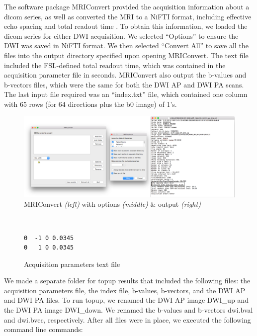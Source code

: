 The software package MRIConvert provided the acquisition information about a dicom series, as well as converted the MRI to a NiFTI format, including effective echo spacing and total readout time \cite{ref:mriconvert}. To obtain this information, we loaded the dicom series for either DWI acquisition. We selected ``Options'' to ensure the DWI was saved in NiFTI format. We then selected ``Convert All'' to save all the files into the output directory specified upon opening MRIConvert. The text file included the FSL-defined total readout time, which was contained in the acquisition parameter file in seconds. MRIConvert also output the b-values and b-vectors files, which were the same for both the DWI AP and DWI PA scans. The last input file required was an ``index.txt'' file, which contained one column with 65 rows (for 64 directions plus the b0 image) of 1's.

\begin{figure}[H]
    \centering
    \includegraphics[width=\textwidth]{Figures/combined}
    \caption{MRIConvert \textit{(left)} with options \textit{(middle)} \& output \textit{(right)} }
    \label{fig:mri_convert}
\end{figure}

\begin{figure}[H]
\centering
{\tt
\begin{varwidth}{\linewidth}
\begin{verbatim}
0  -1 0 0.0345
0   1 0 0.0345
\end{verbatim}
\end{varwidth}
}
\label{fig:acq}
\caption{Acquisition parameters text file}
\end{figure}

We made a separate folder for topup results that included the following files: the acquisition parameters file, the index file, b-values, b-vectors, and the DWI AP and DWI PA files. To run topup, we renamed the DWI AP image DWI\_up and the DWI PA image DWI\_down. We renamed the b-values and b-vectors dwi.bval and dwi.bvec, respectively. After all files were in place, we executed the following command line commands:


